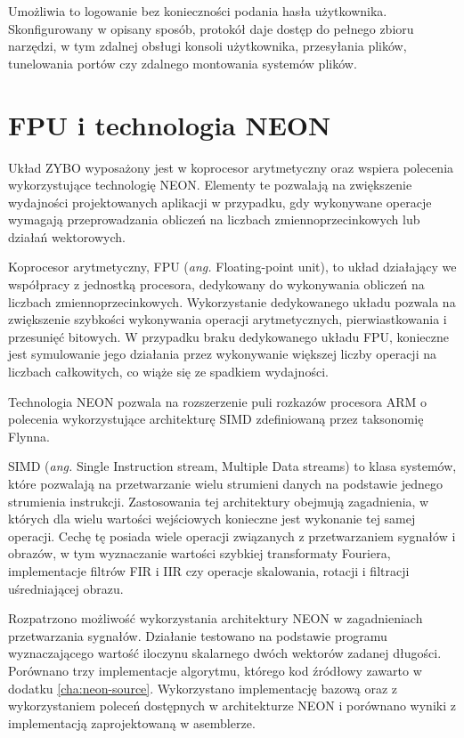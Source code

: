 Umożliwia to logowanie bez konieczności podania hasła użytkownika. Skonfigurowany w opisany sposób, protokół daje dostęp do pełnego zbioru narzędzi, w tym zdalnej obsługi konsoli użytkownika, przesyłania plików, tunelowania portów czy zdalnego montowania systemów plików.
\section{FPU i technologia NEON}
\label{sec:arm-neon}
Układ ZYBO wyposażony jest w koprocesor arytmetyczny oraz wspiera polecenia wykorzystujące technologię NEON. \cite{neon-home} Elementy te pozwalają na zwiększenie wydajności projektowanych aplikacji w przypadku, gdy wykonywane operacje wymagają przeprowadzania obliczeń na liczbach zmiennoprzecinkowych lub działań wektorowych.

Koprocesor arytmetyczny, FPU (\emph{ang.} Floating-point unit), to układ działający we współpracy z jednostką procesora, dedykowany do wykonywania obliczeń na liczbach zmiennoprzecinkowych. Wykorzystanie dedykowanego układu pozwala na zwiększenie szybkości wykonywania operacji arytmetycznych, pierwiastkowania i przesunięć bitowych. W przypadku braku dedykowanego układu FPU, konieczne jest symulowanie jego działania przez wykonywanie większej liczby operacji na liczbach całkowitych, co wiąże się ze spadkiem wydajności.

Technologia NEON pozwala na rozszerzenie puli rozkazów procesora ARM o polecenia wykorzystujące architekturę SIMD zdefiniowaną przez taksonomię Flynna.\cite{Flynn1972}

SIMD (\emph{ang.} Single Instruction stream, Multiple Data streams) to klasa systemów, które pozwalają na przetwarzanie wielu strumieni danych na podstawie jednego strumienia instrukcji. Zastosowania tej architektury obejmują zagadnienia, w których dla wielu wartości wejściowych konieczne jest wykonanie tej samej operacji. Cechę tę posiada wiele operacji związanych z przetwarzaniem sygnałów i obrazów, w tym  wyznaczanie wartości szybkiej transformaty Fouriera, implementacje filtrów FIR i IIR czy operacje skalowania, rotacji i filtracji uśredniającej obrazu.

Rozpatrzono możliwość wykorzystania architektury NEON w zagadnieniach przetwarzania sygnałów. Działanie testowano na podstawie programu wyznaczającego wartość iloczynu skalarnego dwóch wektorów zadanej długości. Porównano trzy implementacje algorytmu, którego kod źródłowy zawarto w dodatku \ref{cha:neon-source}.
Wykorzystano implementację bazową oraz z wykorzystaniem poleceń dostępnych w architekturze NEON i porównano wyniki z implementacją zaprojektowaną w asemblerze.

